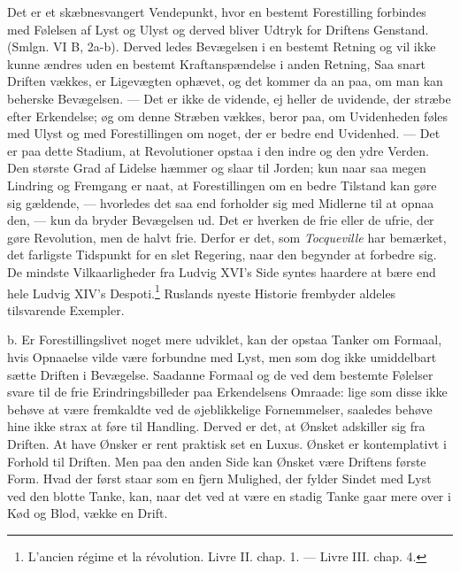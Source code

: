 \documentclass[12pt,a4paper,openany]{book}
\newcommand{\opage}[1]{\marginnote{\footnotesize\textit{[#1]}}}
\begin{document}
Det er et skæbnesvangert Vendepunkt, hvor en bestemt Forestilling
forbindes med Følelsen af Lyst og Ulyst og derved
\opage{381}bliver Udtryk for Driftens Genstand. (Smlgn. VI B, 2a-b).
Derved ledes Bevægelsen i en bestemt Retning og vil ikke kunne ændres
uden en bestemt Kraftanspændelse i anden Retning, Saa snart Driften
vækkes, er Ligevægten ophævet, og det kommer da an paa, om man kan
beherske Bevægelsen. --- Det er ikke de vidende, ej heller de uvidende,
der stræbe efter Erkendelse; øg om denne Stræben vækkes, beror paa, om
Uvidenheden føles med Ulyst og med Forestillingen om noget, der er bedre
end Uvidenhed. --- Det er paa dette Stadium, at Revolutioner opstaa i
den indre og den ydre Verden. Den største Grad af Lidelse hæmmer og
slaar til Jorden; kun naar saa megen Lindring og Fremgang er naat, at
Forestillingen om en bedre Tilstand kan gøre sig gældende, --- hvorledes
det saa end forholder sig med Midlerne til at opnaa den, --- kun da
bryder Bevægelsen ud. Det er hverken de frie eller de ufrie, der gøre
Revolution, men de halvt frie. Derfor er det, som \emph{Tocqueville} har
bemærket, det farligste Tidspunkt for en slet Regering, naar den
begynder at forbedre sig. De mindste Vilkaarligheder fra Ludvig XVI’s
Side syntes haardere at bære end hele Ludvig XIV’s
Despoti.\footnote[1]{L’ancien régime et la révolution. Livre II. chap.
1. --- Livre III. chap. 4.} Ruslands nyeste Historie frembyder aldeles
tilsvarende Exempler.

b. Er Forestillingslivet noget mere udviklet, kan der opstaa Tanker om
Formaal, hvis Opnaaelse vilde være forbundne med Lyst, men som dog ikke
umiddelbart sætte Driften i Bevægelse. Saadanne Formaal og de ved dem
bestemte Følelser svare til de frie Erindringsbilleder paa Erkendelsens
Omraade: lige som disse ikke behøve at være fremkaldte ved de
øjeblikkelige Fornemmelser, saaledes behøve hine ikke strax at føre til
Handling. Derved er det, at Ønsket adskiller sig fra Driften. At have
Ønsker er rent praktisk set en Luxus. Ønsket er kontemplativt i Forhold
til Driften. Men paa den anden Side kan Ønsket være Driftens første
Form. Hvad der først staar som en fjern Mulighed, der fylder Sindet med
Lyst ved den blotte Tanke, kan, naar det ved at være en stadig Tanke
gaar mere over i Kød og Blod, vække en Drift.
\end{document}
